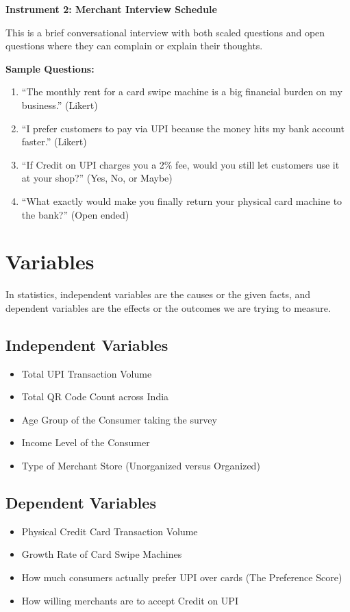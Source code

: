 \textbf{Instrument 2: Merchant Interview Schedule}

This is a brief conversational interview with both scaled questions and open questions where they can complain or explain their thoughts.

\textbf{Sample Questions:}
\begin{enumerate}
    \item ``The monthly rent for a card swipe machine is a big financial burden on my business.'' (Likert)
    \item ``I prefer customers to pay via UPI because the money hits my bank account faster.'' (Likert)
    \item ``If Credit on UPI charges you a 2\% fee, would you still let customers use it at your shop?'' (Yes, No, or Maybe)
    \item ``What exactly would make you finally return your physical card machine to the bank?'' (Open ended)
\end{enumerate}

\section{Variables}

In statistics, independent variables are the causes or the given facts, and dependent variables are the effects or the outcomes we are trying to measure.

\subsection{Independent Variables}

\begin{itemize}
    \item Total UPI Transaction Volume
    \item Total QR Code Count across India
    \item Age Group of the Consumer taking the survey
    \item Income Level of the Consumer
    \item Type of Merchant Store (Unorganized versus Organized)
\end{itemize}

\subsection{Dependent Variables}

\begin{itemize}
    \item Physical Credit Card Transaction Volume
    \item Growth Rate of Card Swipe Machines
    \item How much consumers actually prefer UPI over cards (The Preference Score)
    \item How willing merchants are to accept Credit on UPI
\end{itemize}

